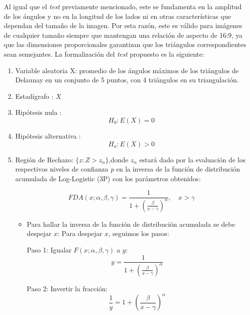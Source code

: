 \documentclass[12pt]{report}
\begin{document}
Al igual que el \textit{test} previamente mencionado, este se fundamenta en la amplitud de los ángulos y no en la longitud de los lados ni en otras características que dependan del tamaño de la imagen. Por esta razón, este es válido para imágenes de cualquier tamaño siempre que mantengan una relación de aspecto de 16:9, ya que las dimensiones proporcionales garantizan que los triángulos correspondientes sean semejantes. La formalización del \textit{test} propuesto es la siguiente:
\begin{enumerate}
	\item Variable aleatoria X: promedio de los ángulos máximos de los triángulos de Delaunay en un conjunto de 5 puntos, con 4 triángulos en su triangulación.
	\item Estadígrafo : $X$
	
	\item Hipótesis nula : \[H_0:E(X)=0\]
	
	
	\item Hipótesis alternativa : \[H_a:E(X)>0\]
	
	\item  Región de Rechazo: $\{z:Z>z_\alpha\}$,donde  $z_\alpha$ estará dado por la evaluación de los respectivos niveles de confianza \textit{p} en la  inversa de la función de distribución acumulada de Log-Logistic (3P) con los parámetros obtenidos: 
	
	\[
	FDA(x; \alpha, \beta, \gamma) = \frac{1}{1 + \left( \frac{\beta}{x - \gamma} \right)^\alpha}, \quad x > \gamma
	\]
	\begin{itemize}
		\item  Para hallar la inversa de la función de distribución acumulada se debe despejar $x$:
		Para despejar \( x \), seguimos los pasos:
		
		Paso 1: Igualar \( F(x; \alpha, \beta, \gamma) \) a \( y \):
		\[
		y = \frac{1}{1 + \left( \frac{\beta}{x - \gamma} \right)^\alpha}
		\]
		
		Paso 2: Invertir la fracción:
		\[
		\frac{1}{y} = 1 + \left( \frac{\beta}{x - \gamma} \right)^\alpha
		\]
		

\end{itemize}
\end{enumerate}
\end{document}
